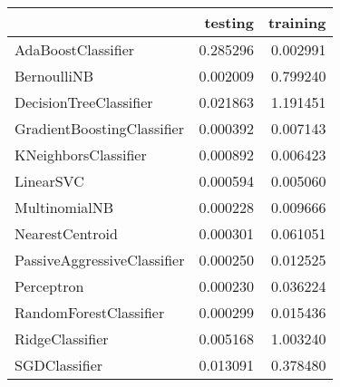\begin{tabular}{lrr}
\toprule
{} &   testing &  training \\
\midrule
AdaBoostClassifier          &  0.285296 &  0.002991 \\
BernoulliNB                 &  0.002009 &  0.799240 \\
DecisionTreeClassifier      &  0.021863 &  1.191451 \\
GradientBoostingClassifier  &  0.000392 &  0.007143 \\
KNeighborsClassifier        &  0.000892 &  0.006423 \\
LinearSVC                   &  0.000594 &  0.005060 \\
MultinomialNB               &  0.000228 &  0.009666 \\
NearestCentroid             &  0.000301 &  0.061051 \\
PassiveAggressiveClassifier &  0.000250 &  0.012525 \\
Perceptron                  &  0.000230 &  0.036224 \\
RandomForestClassifier      &  0.000299 &  0.015436 \\
RidgeClassifier             &  0.005168 &  1.003240 \\
SGDClassifier               &  0.013091 &  0.378480 \\
\bottomrule
\end{tabular}
